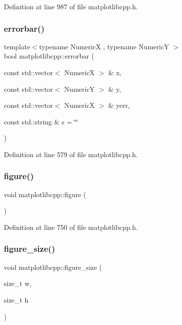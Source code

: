 Definition at line 987 of file matplotlibcpp.\+h.

\mbox{\label{namespacematplotlibcpp_a1ed29787f67ecb8c156e7c4abbcd25b4}} 
\subsubsection{\texorpdfstring{errorbar()}{errorbar()}}
{\footnotesize\ttfamily template$<$typename NumericX , typename NumericY $>$ \\
bool matplotlibcpp\+::errorbar (\begin{DoxyParamCaption}\item[{const std\+::vector$<$ NumericX $>$ \&}]{x,  }\item[{const std\+::vector$<$ NumericY $>$ \&}]{y,  }\item[{const std\+::vector$<$ NumericX $>$ \&}]{yerr,  }\item[{const std\+::string \&}]{s = {\ttfamily \char`\"{}\char`\"{}} }\end{DoxyParamCaption})}



Definition at line 579 of file matplotlibcpp.\+h.

\mbox{\label{namespacematplotlibcpp_ade0e4c19cb3e1c9e4919f67da97bb992}} 
\subsubsection{\texorpdfstring{figure()}{figure()}}
{\footnotesize\ttfamily void matplotlibcpp\+::figure (\begin{DoxyParamCaption}{ }\end{DoxyParamCaption})\hspace{0.3cm}{\ttfamily [inline]}}



Definition at line 750 of file matplotlibcpp.\+h.

\mbox{\label{namespacematplotlibcpp_a91e91bcdcfc7632a917830bfe3f71ca3}} 
\subsubsection{\texorpdfstring{figure\_size()}{figure\_size()}}
{\footnotesize\ttfamily void matplotlibcpp\+::figure\+\_\+size (\begin{DoxyParamCaption}\item[{size\+\_\+t}]{w,  }\item[{size\+\_\+t}]{h }\end{DoxyParamCaption})\hspace{0.3cm}{\ttfamily [inline]}}



